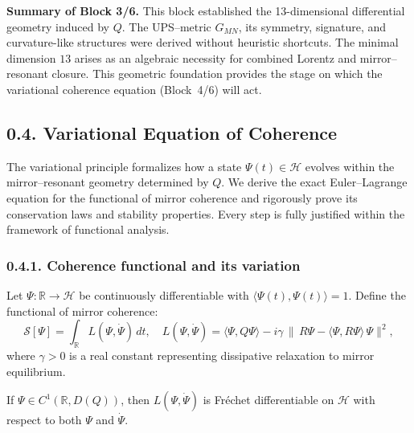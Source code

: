 \noindent\textbf{Summary of Block 3/6.}
This block established the 13-dimensional differential geometry induced by $Q$.
The UPS–metric $G_{MN}$, its symmetry, signature, and curvature-like structures were derived without heuristic shortcuts.
The minimal dimension $13$ arises as an algebraic necessity for combined Lorentz and mirror–resonant closure.
This geometric foundation provides the stage on which the variational coherence equation (Block~4/6) will act.



\subsection*{0.4. Variational Equation of Coherence}

\noindent
The variational principle formalizes how a state $\Psi(t)\in\mathcal{H}$ evolves within the mirror–resonant geometry determined by $Q$.
We derive the exact Euler–Lagrange equation for the functional of mirror coherence and rigorously prove its conservation laws and stability properties.
Every step is fully justified within the framework of functional analysis.

\subsubsection*{0.4.1. Coherence functional and its variation}

Let $\Psi:\mathbb{R}\to\mathcal{H}$ be continuously differentiable with $\langle\Psi(t),\Psi(t)\rangle=1$.
Define the functional of mirror coherence:
\[
\mathcal{S}[\Psi]
=
\int_{\mathbb{R}} L(\Psi,\dot\Psi)\,dt,
\quad
L(\Psi,\dot\Psi)
=
\langle\Psi,Q\Psi\rangle
 - i\gamma\,\|\,R\Psi - \langle\Psi,R\Psi\rangle\,\Psi\|^2,
\]
where $\gamma>0$ is a real constant representing dissipative relaxation to mirror equilibrium.

\begin{lemma}[Differentiability of $L$]
If $\Psi\in C^1(\mathbb{R},D(Q))$, then $L(\Psi,\dot\Psi)$ is Fréchet differentiable on $\mathcal{H}$ with respect to both $\Psi$ and $\dot\Psi$.
\end{lemma}


